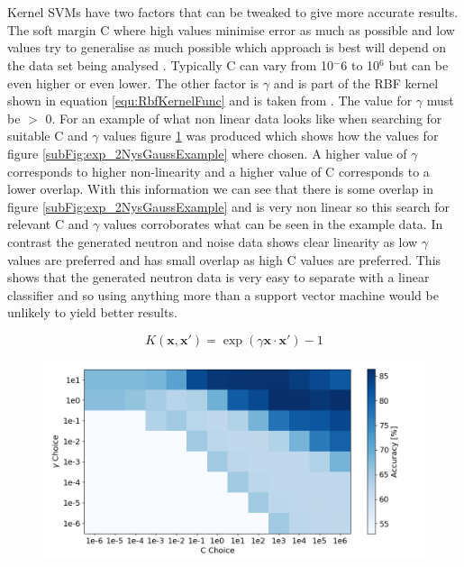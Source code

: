 \\\\Kernel SVMs have two factors that can be tweaked to give more accurate results. The soft margin C where high values minimise error as much as possible and low values try to generalise as much possible which approach is best will depend on the data set being analysed \cite{cortes1995support}. Typically C can vary from 10$^-6$ to 10$^6$ but can be even higher or even lower. The other factor is $\gamma$ and is part of the RBF kernel shown in equation \ref{equ:RbfKernelFunc} and is taken from \cite{Boser92atraining}. The value for $\gamma$ must be $>$ 0. For an example of what non linear data looks like when searching for suitable C and $\gamma$ values figure \ref{fig:GammaCGridSearchExp2Gauss} was produced which shows how the values for figure \ref{subFig:exp_2NysGaussExample} where chosen. A higher value of $\gamma$ corresponds to higher non-linearity and a higher value of C corresponds to a lower overlap. With this information we can see that there is some overlap in figure \ref{subFig:exp_2NysGaussExample} and is very non linear so this search for relevant C and $\gamma$ values corroborates what can be seen in the example data. In contrast the generated neutron and noise data shows clear linearity as low $\gamma$ values are preferred and has small overlap as high C values are preferred. This shows that the generated neutron data is very easy to separate with a linear classifier and so using anything more than a support vector machine would be unlikely to yield better results.

\begin{equation}
K(\mathbf{x,x'}) = \exp{(\gamma \mathbf{x \cdot x'})} - 1
\label{equ:RbfKernelFunc}
\end{equation}

\begin{figure}[htbp]
\centering
\includegraphics[width=0.9\linewidth]{Chapter4/Figs/Raster/GammaCGridSearchExp2Gauss.png}
\label{fig:GammaCGridSearchExp2Gauss}
\end{figure}

